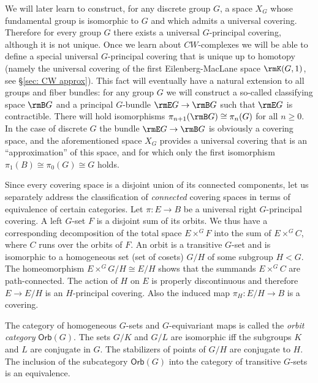 \begin{rem}\label{rem: classifying space for discrete G}
    We will later learn to construct, for any discrete group $G$, a space $X_G$ whose fundamental group is isomorphic to $G$ and which admits a universal covering. Therefore for every group $G$ there exists a universal $G$-principal covering, although it is not unique. Once we learn about $CW$-complexes we will be able to define a special universal $G$-principal covering that is unique up to homotopy (namely the universal covering of the first Eilenberg-MacLane space $\rmK(G,1)$, see \S\ref{sec: CW approx}). This fact will eventually have a natural extension to all groups and fiber bundles: for any group $G$ we will construct a so-called classifying space $\rmB G$ and a principal $G$-bundle $\rmE G\to \rmB G$ such that $\rmE G$ is contractible. There will hold isomorphisms $\pi_{n+1}(\rmB G)\cong \pi_{n}(G)$ for all $n\geq 0$. In the case of discrete $G$ the bundle $\rmE G\to \rmB G$ is obviously a covering space, and the aforementioned space $X_G$ provides a universal covering that is an ``approximation'' of this space, and for which only the first isomorphism $\pi_1(B)\cong \pi_0(G)\cong G$ holds.
\end{rem}

Since every covering space is a disjoint union of its connected components, let us separately address the classification of \emph{connected} covering spaces in terms of equivalence of certain categories. Let $\pi:E\to B$ be a universal right $G$-principal covering. A left $G$-set $F$ is a disjoint sum of its orbits. We thus have a corresponding decomposition of the total space $E\times^G F$ into the sum of $E\times^G C$, where $C$ runs over the orbits of $F$. An orbit is a transitive $G$-set and is isomorphic to a homogeneous set (set of cosets) $G\slash H$ of some subgroup $H<G$. The homeomorphism $E\times^G G\slash H\cong E\slash H$ shows that the summands $E\times^G C$ are path-connected. The action of $H$ on $E$ is properly discontinuous and therefore $E\to E\slash H$ is an $H$-principal covering. Also the induced map $\pi_H:E\slash H\to B$ is a covering.

The category of homogeneous $G$-sets and $G$-equivariant maps is called the \emph{orbit category} $\mathsf{Orb}(G)$. The sets $G\slash K$ and $G\slash L$ are isomorphic iff the subgroups $K$ and $L$ are conjugate in $G$. The stabilizers of points of $G\slash H$ are conjugate to $H$. The inclusion of the subcategory $\mathsf{Orb}(G)$ into the category of transitive $G$-sets is an equivalence.

